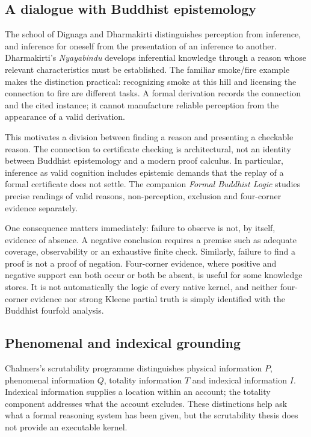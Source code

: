 \documentclass[11pt,a4paper]{article}
\theoremstyle{plain}
\theoremstyle{definition}
\theoremstyle{remark}
\begin{document}
\subsection{A dialogue with Buddhist epistemology}\label{sec:buddhist}

The school of Dignaga and Dharmakirti distinguishes perception from inference,
and inference for oneself from the presentation of an inference to another.
Dharmakirti's \emph{Nyayabindu} develops inferential knowledge through a reason
whose relevant characteristics must be established\cite{Nyayabindu}.
The familiar smoke/fire example makes the distinction practical: recognizing
smoke at this hill and licensing the connection to fire are different tasks.
A formal derivation records the connection and the cited instance; it cannot
manufacture reliable perception from the appearance of a valid derivation.

This motivates a division between finding a reason and presenting a checkable
reason. The connection to certificate checking is architectural, not an
identity between Buddhist epistemology and a modern proof calculus.
In particular, inference as valid cognition includes epistemic demands that
the replay of a formal certificate does not settle. The companion
\emph{Formal Buddhist Logic} studies precise readings of valid reasons,
non-perception, exclusion and four-corner evidence separately.

One consequence matters immediately: failure to observe is not, by itself,
evidence of absence. A negative conclusion requires a premise such as adequate
coverage, observability or an exhaustive finite check. Similarly, failure to
find a proof is not a proof of negation. Four-corner evidence, where positive
and negative support can both occur or both be absent, is useful for some
knowledge stores. It is not automatically the logic of every native kernel,
and neither four-corner evidence nor strong Kleene partial truth is simply
identified with the Buddhist fourfold analysis.

\subsection{Phenomenal and indexical grounding}\label{sec:pqti}

Chalmers's scrutability programme distinguishes physical information $P$,
phenomenal information $Q$, totality information $T$ and indexical information
$I$\cite{ChalmersJackson,ChalmersWorld}. Indexical information supplies a
location within an account; the totality component addresses what the account
excludes. These distinctions help ask what a formal reasoning system has been
given, but the scrutability thesis does not provide an executable kernel.
\end{document}
